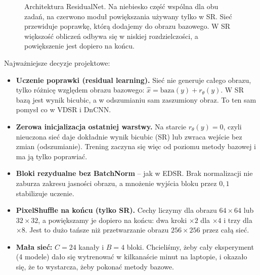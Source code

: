 \documentclass[11pt,a4paper]{article}
\newcommand{\nazwa}{ResidualNet}
\begin{document}
\begin{figure}[H]
  \caption{Architektura \nazwa. Na niebiesko część wspólna dla obu zadań, na czerwono moduł powiększania
    używany tylko w SR. Sieć przewiduje poprawkę, którą dodajemy do obrazu bazowego. W SR większość obliczeń
    odbywa się w niskiej rozdzielczości, a powiększenie jest dopiero na końcu.}
  \label{fig:architektura}
\end{figure}

Najważniejsze decyzje projektowe:
\begin{itemize}
  \item \textbf{Uczenie poprawki (residual learning).} Sieć nie generuje całego obrazu, tylko różnicę
        względem obrazu bazowego: $\hat{x} = \text{baza}(y) + r_\theta(y)$. W SR bazą jest wynik bicubic,
        a w odszumianiu sam zaszumiony obraz. To ten sam pomysł co w VDSR i DnCNN.
  \item \textbf{Zerowa inicjalizacja ostatniej warstwy.} Na starcie $r_\theta(y)=0$, czyli nieuczona sieć
        daje dokładnie wynik bicubic (SR) lub zwraca wejście bez zmian (odszumianie). Trening zaczyna się więc
        od poziomu metody bazowej i ma ją tylko poprawiać.
  \item \textbf{Bloki rezydualne bez BatchNorm} -- jak w EDSR. Brak normalizacji nie zaburza zakresu
        jasności obrazu, a mnożenie wyjścia bloku przez $0{,}1$ stabilizuje uczenie.
  \item \textbf{PixelShuffle na końcu (tylko SR).} Cechy liczymy dla obrazu $64\times64$ lub $32\times32$,
        a powiększamy je dopiero na końcu: dwa kroki $\times2$ dla $\times4$ i trzy dla $\times8$.
        Jest to dużo tańsze niż przetwarzanie obrazu $256\times256$ przez całą sieć.
  \item \textbf{Mała sieć:} $C=24$ kanały i $B=4$ bloki. Chcieliśmy, żeby cały eksperyment (4 modele)
        dało się wytrenować w kilkanaście minut na laptopie, i okazało się, że to wystarcza, żeby pokonać
        metody bazowe.
\end{itemize}
\end{document}

